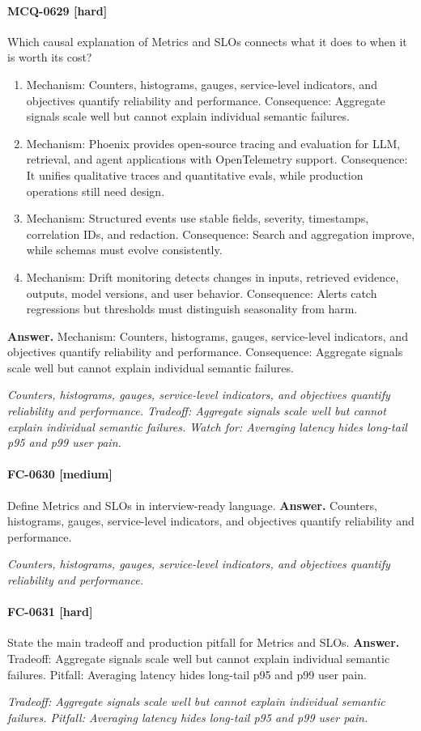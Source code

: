 \paragraph{MCQ-0629 [hard]} Which causal explanation of Metrics and SLOs connects what it does to when it is worth its cost?
\begin{enumerate}[label=\Alph*.]
\item Mechanism: Counters, histograms, gauges, service-level indicators, and objectives quantify reliability and performance. Consequence: Aggregate signals scale well but cannot explain individual semantic failures.
\item Mechanism: Phoenix provides open-source tracing and evaluation for LLM, retrieval, and agent applications with OpenTelemetry support. Consequence: It unifies qualitative traces and quantitative evals, while production operations still need design.
\item Mechanism: Structured events use stable fields, severity, timestamps, correlation IDs, and redaction. Consequence: Search and aggregation improve, while schemas must evolve consistently.
\item Mechanism: Drift monitoring detects changes in inputs, retrieved evidence, outputs, model versions, and user behavior. Consequence: Alerts catch regressions but thresholds must distinguish seasonality from harm.
\end{enumerate}
\noindent\textbf{Answer.} Mechanism: Counters, histograms, gauges, service-level indicators, and objectives quantify reliability and performance. Consequence: Aggregate signals scale well but cannot explain individual semantic failures.
\par\textit{Counters, histograms, gauges, service-level indicators, and objectives quantify reliability and performance. Tradeoff: Aggregate signals scale well but cannot explain individual semantic failures. Watch for: Averaging latency hides long-tail p95 and p99 user pain.}
\paragraph{FC-0630 [medium]} Define Metrics and SLOs in interview-ready language.
\noindent\textbf{Answer.} Counters, histograms, gauges, service-level indicators, and objectives quantify reliability and performance.
\par\textit{Counters, histograms, gauges, service-level indicators, and objectives quantify reliability and performance.}
\paragraph{FC-0631 [hard]} State the main tradeoff and production pitfall for Metrics and SLOs.
\noindent\textbf{Answer.} Tradeoff: Aggregate signals scale well but cannot explain individual semantic failures. Pitfall: Averaging latency hides long-tail p95 and p99 user pain.
\par\textit{Tradeoff: Aggregate signals scale well but cannot explain individual semantic failures. Pitfall: Averaging latency hides long-tail p95 and p99 user pain.}
